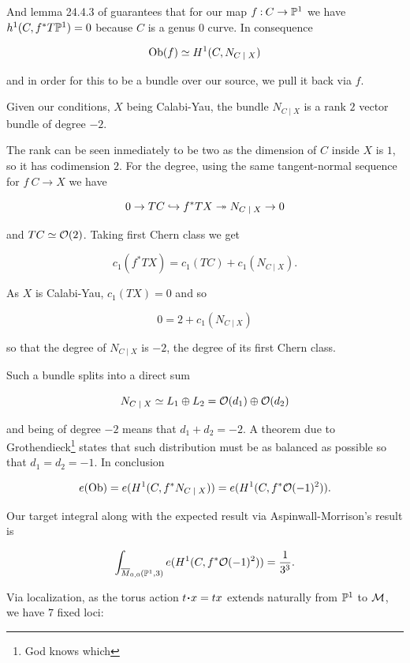 \documentclass[12pt]{memoir}
\begin{document}
And lemma 24.4.3 of \cite{BigMirrorSymmetryBook} guarantees that for our map \(f\mathbin{:} C\to\mathbb{P}^1\) we have \(h^1(C,f^\ast T\mathbb{P}^1)=0\) because \(C\) is a genus 0 curve. In consequence

\[\Ob(f)\isom H^1(C,N_{C\mid X})\]

and in order for this to be a bundle over our source, we pull it back via \(f\).

\begin{Prop}
    Given our conditions, \(X\) being Calabi-Yau, the bundle \(N_{C\mid X}\) is a rank \(2\) vector bundle of degree \(-2\).
\end{Prop}

\begin{ptcbp}
    The rank can be seen inmediately to be two as the dimension of \(C\) inside \(X\) is \(1\), so it has codimension \(2\). For the degree, using the same tangent-normal sequence for \(f\: C\to X\) we have

    \[0\to TC\hookto f^\ast TX\onto N_{C\mid X}\to 0\]

    and \(TC\simeq\mathcal{O}(2)\). Taking first Chern class we get

    \[c_1(f^\ast TX)=c_1(TC)+c_1(N_{C\mid X}).\]

    As \(X\) is Calabi-Yau, \(c_1(TX)=0\) and so

    \[0=2+c_1(N_{C\mid X})\]

    so that the degree of \(N_{C\mid X}\) is \(-2\), the degree of its first Chern class.
\end{ptcbp}

Such a bundle splits into a direct sum

\[N_{C\mid X}\isom L_1\oplus L_2=\cO(d_1)\oplus\cO(d_2)\]

and being of degree \(-2\) means that \(d_1+d_2=-2\). A theorem due to Grothendieck\footnote{God knows which} states that such distribution must be as balanced as possible so that \(d_1=d_2=-1\). In conclusion

\[e(\Ob)=e(H^1(C,f^\ast N_{C\mid X}))=e(H^1(C,f^\ast\cO(-1)^2)).\]

Our target integral along with the expected result via Aspinwall-Morrison's result is

\[\int_{\overline{M}_{0,0}(\mathbb{P}^1,3)}e(H^1(C,f^\ast\mathcal{O}(-1)^2))=\frac{1}{3^3}.\]

Via localization, as the torus action \(t\.x=tx\) extends naturally from \(\mathbb{P}^1\) to \(\mathcal{M}\), we have \(7\) fixed loci:

\end{document}
